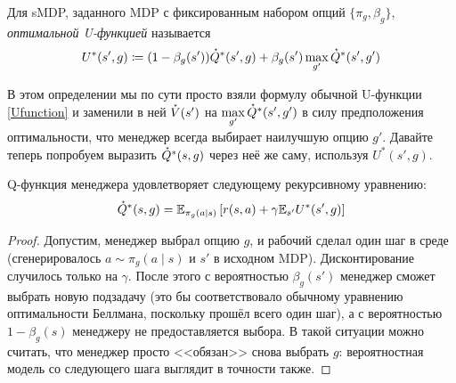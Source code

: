 \begin{definition}
Для sMDP, заданного MDP с фиксированным набором опций $\{\pi_g, \beta_g\}$, \emph{оптимальной U-функцией} называется
\begin{equation}\label{U*function}
U^*(s', g) \coloneqq (1 - \beta_g(s'))\accentset{\star}{Q}^*(s', g) + \beta_g(s') \max\limits_{g'} \accentset{\star}{Q}^*(s', g')
\end{equation}
\end{definition}

В этом определении мы по сути просто взяли формулу обычной U-функции \eqref{Ufunction} и заменили в ней $\accentset{\star}{V}(s')$ на $\max\limits_{g'} \accentset{\star}{Q}^*(s', g')$ в силу предположения оптимальности, что менеджер всегда выбирает наилучшую опцию $g'$. Давайте теперь попробуем выразить $\accentset{\star}{Q}^*(s, g)$ через неё же саму, используя $U^*(s', g)$.

\begin{proposition}\label{pr:managerQ*U*}
Q-функция менеджера удовлетворяет следующему рекурсивному уравнению:
\begin{equation}\label{managerQ*U*}
\accentset{\star}{Q}^*(s, g) = \mathbb{E}_{\pi_g(a \mid s)} \left[ r(s, a) + \gamma \mathbb{E}_{s'} U^*(s', g)\right]
\end{equation}
\begin{proof}
Допустим, менеджер выбрал опцию $g$, и рабочий сделал один шаг в среде (сгенерировалось $a \sim \pi_g(a \mid s)$ и $s'$ в исходном MDP). Дисконтирование случилось только на $\gamma$. После этого с вероятностью $\beta_g(s')$ менеджер сможет выбрать новую подзадачу (это бы соответствовало обычному уравнению оптимальности Беллмана, поскольку прошёл всего один шаг), а с вероятностью $1 - \beta_g(s)$ менеджеру не предоставляется выбора. В такой ситуации можно считать, что менеджер просто <<обязан>> снова выбрать $g$: вероятностная модель со следующего шага выглядит в точности также.
\end{proof}
\end{proposition}

